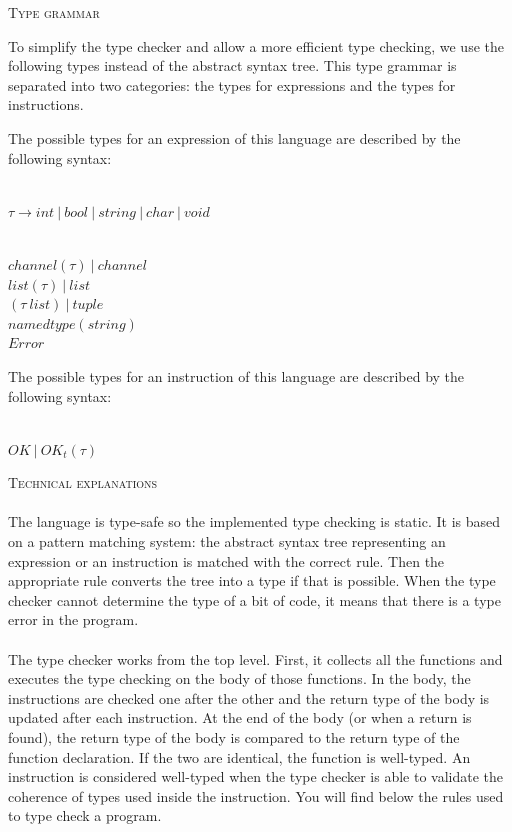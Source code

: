 \documentclass[11pt]{report}
\begin{document}
\newpage

{}

\vspace*{10pt}
\vspace*{3pt}
{}
\tabto{1cm} {\Large \textsc{Type grammar}}

\tabto{0cm}To simplify the type checker and allow a more efficient type checking, we use the following types instead of the abstract syntax tree. This type grammar is separated into two categories: the types for expressions and the types for instructions.

\tabto{0cm}The possible types for an expression of this language are described by the following syntax:
\\ \\
\centerline{$\tau \rightarrow int \ | \ bool \ | \ string \ | \ char \ | \ void$} \\
$ channel( \tau) \ | \ channel $ \\
$ list(\tau) \ | \ list $ \\
$ ( \tau \ list) \ | \ tuple $ \\
$ namedtype(string)$ \\
$ Error $

\tabto{0cm}The possible types for an instruction of this language are described by the following syntax:
\\ \\
\centerline{$OK \ | \ OK_t(\tau)$}

\vspace*{10pt}
\vspace*{3pt}
{}
\tabto{1cm} {\Large \textsc{Technical explanations}}
\\ \\
\tabto{1cm}The language is type-safe so the implemented type checking is static. It is based on a pattern matching system: the abstract syntax tree representing an expression or an instruction is matched with the correct rule. Then the appropriate rule converts the tree into a type if that is possible. When the type checker cannot determine the type of a bit of code, it means that there is a type error in the program.
\\ \\
\tabto{1cm}The type checker works from the top level. First, it collects all the functions and executes the type checking on the body of those functions. In the body, the instructions are checked one after the other and the return type of the body is updated after each instruction. At the end of the body (or when a return is found), the return type of the body is compared to the return type of the function declaration. If the two are identical, the function is well-typed. An instruction is considered well-typed when the type checker is able to validate the coherence of types used inside the instruction. You will find below the rules used to type check a program. 
\end{document}
